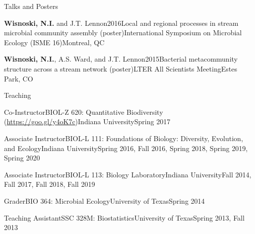 \documentclass{resume} %
\begin{document}
\begin{rhangSection}{Talks and Posters}
  \begin{Presentation}{{\bf Wisnoski, N.I.} and J.T. Lennon}{2016}{Local and regional processes in stream microbial community assembly (poster)}{International Symposium on Microbial Ecology (ISME 16)}{Montreal, QC}
  \end{Presentation}

  \begin{Presentation}{{\bf Wisnoski, N.I.}, A.S. Ward, and J.T. Lennon}{2015}{Bacterial metacommunity structure across a stream network (poster)}{LTER All Scientists Meeting}{Estes Park, CO}
  \end{Presentation}

\end{rhangSection}

\bigskip

\begin{rSection}{Teaching}

\begin{Course}
  {Co-Instructor}{BIOL-Z 620: Quantitative Biodiversity (\url{https://goo.gl/y4oK7c})}{Indiana University}{Spring 2017}
\end{Course}

\begin{Course}
  {Associate Instructor}{BIOL-L 111: Foundations of Biology: Diversity, Evolution, and Ecology}{Indiana University}{Spring 2016, Fall 2016, Spring 2018, Spring 2019, Spring 2020}
\end{Course}

\begin{Course}
  {Associate Instructor}{BIOL-L 113: Biology Laboratory}{Indiana University}{Fall 2014, Fall 2017, Fall 2018, Fall 2019}
\end{Course}

\begin{Course}
  {Grader}{BIO 364: Microbial Ecology}{University of Texas}{Spring 2014}
\end{Course}

\begin{Course}
  {Teaching Assistant}{SSC 328M: Biostatistics}{University of Texas}{Spring 2013, Fall 2013}
\end{Course}

\end{rSection}

\bigskip
\end{document}
